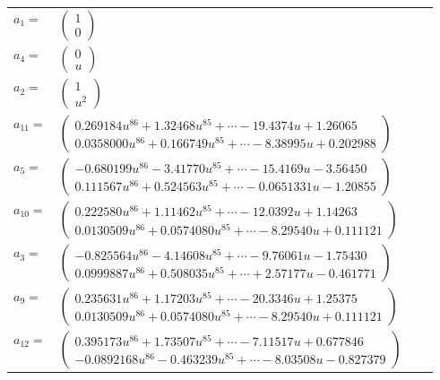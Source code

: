\documentclass[1p]{elsarticle_modified}
\theoremstyle{definition}
\begin{document}
\begin{tabular}{m{7pt} m{180pt} m{7pt} m{180pt} }
\flushright $a_{1}=$&$\begin{pmatrix}1\\0\end{pmatrix}$ \\
\flushright $a_{4}=$&$\begin{pmatrix}0\\u\end{pmatrix}$ \\
\flushright $a_{2}=$&$\begin{pmatrix}1\\u^2\end{pmatrix}$ \\
\flushright $a_{11}=$&$\begin{pmatrix}0.269184 u^{86}+1.32468 u^{85}+\cdots-19.4374 u+1.26065\\0.0358000 u^{86}+0.166749 u^{85}+\cdots-8.38995 u+0.202988\end{pmatrix}$ \\
\flushright $a_{5}=$&$\begin{pmatrix}-0.680199 u^{86}-3.41770 u^{85}+\cdots-15.4169 u-3.56450\\0.111567 u^{86}+0.524563 u^{85}+\cdots-0.0651331 u-1.20855\end{pmatrix}$ \\
\flushright $a_{10}=$&$\begin{pmatrix}0.222580 u^{86}+1.11462 u^{85}+\cdots-12.0392 u+1.14263\\0.0130509 u^{86}+0.0574080 u^{85}+\cdots-8.29540 u+0.111121\end{pmatrix}$ \\
\flushright $a_{3}=$&$\begin{pmatrix}-0.825564 u^{86}-4.14608 u^{85}+\cdots-9.76061 u-1.75430\\0.0999887 u^{86}+0.508035 u^{85}+\cdots+2.57177 u-0.461771\end{pmatrix}$ \\
\flushright $a_{9}=$&$\begin{pmatrix}0.235631 u^{86}+1.17203 u^{85}+\cdots-20.3346 u+1.25375\\0.0130509 u^{86}+0.0574080 u^{85}+\cdots-8.29540 u+0.111121\end{pmatrix}$ \\
\flushright $a_{12}=$&$\begin{pmatrix}0.395173 u^{86}+1.73507 u^{85}+\cdots-7.11517 u+0.677846\\-0.0892168 u^{86}-0.463239 u^{85}+\cdots-8.03508 u-0.827379\end{pmatrix}$ \\

\end{tabular}
\end{document}
